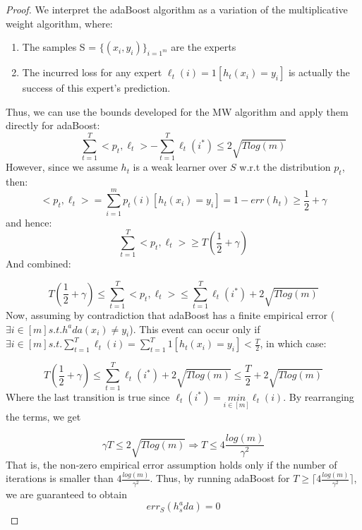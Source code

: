 \begin{proof}
    
    We interpret the adaBoost algorithm as a variation of the multiplicative weight algorithm, where:
    \begin{enumerate}
        \item The samples S = $\{(x_i, y_i)\}_{i=1^m}$ are the experts
        \item The incurred loss for any expert $\ell_t(i) = 1[h_t(x_i) = y_i]$ is actually the success of this expert's prediction.
    \end{enumerate}
    Thus, we can use the bounds developed for the MW algorithm and apply them directly for adaBoost:
    \begin{equation*}
        \sum_{t=1}^T <p_t, \ell_t> - \sum_{t=1}^T \ell_t(i^*) \leq 2\sqrt{T log(m)}
    \end{equation*}
    However, since we assume $h_t$ is a weak learner over $S$ w.r.t the distribution $p_t$, then:
    \begin{equation*}
        <p_t, \ell_t> = \sum_{i=1}^m p_t(i) [h_t(x_i) = y_i] = 1 - err(h_t) \geq \frac{1}{2} + \gamma
    \end{equation*}
    and hence:
    \begin{equation*}
        \sum_{t=1}^T <p_t, \ell_t> \geq T(\frac{1}{2} + \gamma)
    \end{equation*}
    And combined:
    
    \begin{equation*}
        T(\frac{1}{2} + \gamma) \leq \sum_{t=1}^T <p_t, \ell_t> \leq \sum_{t=1}^T \ell_t(i^*) + 2\sqrt{T log(m)}
    \end{equation*}
    Now, assuming by contradiction that adaBoost has a finite empirical error ($\exists i\in [m] s.t. h^ada(x_i) \neq y_i$).
    This event can occur only if $\exists i\in [m] s.t. \sum_{t=1}^T \ell_t(i) = \sum_{t=1}^T 1[h_t(x_i) = y_i]  < \frac{T}{2}$, in which case:
    
    \begin{equation*}
        T(\frac{1}{2} + \gamma) \leq \sum_{t=1}^T \ell_t(i^*) + 2\sqrt{T log(m)} \leq \frac{T}{2} + 2\sqrt{T log(m)}
    \end{equation*}
    Where the last transition is true since $\ell_t(i^*) = \underset{i\in [m]}{min} \ell_t(i)$.
    By rearranging the terms, we get
    
    \begin{equation*}
        \gamma T \leq 2\sqrt{T log(m)} \Rightarrow T \leq 4\frac{log(m)}{\gamma^2}
    \end{equation*}
    That is, the non-zero empirical error assumption holds only if the number of iterations is smaller than $4\frac{log(m)}{\gamma^2}$. Thus, by running adaBoost for $T \geq \lceil 4\frac{log(m)}{\gamma^2} \rceil$, we are guaranteed to obtain
    \begin{equation*}
        err_S(h_s^ada) = 0
    \end{equation*}
\end{proof}